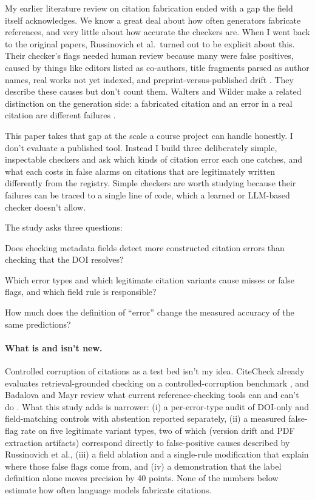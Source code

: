 \documentclass[acmsmall,screen,nonacm]{acmart}
\begin{document}
My earlier literature review on citation fabrication ended with a gap the field itself acknowledges. We know a great deal about how often generators fabricate references, and very little about how accurate the checkers are. When I went back to the original papers, Russinovich et al.\ turned out to be explicit about this. Their checker's flags needed human review because many were false positives, caused by things like editors listed as co-authors, title fragments parsed as author names, real works not yet indexed, and preprint-versus-published drift \citep{russinovich2026}. They describe these causes but don't count them. Walters and Wilder make a related distinction on the generation side: a fabricated citation and an error in a real citation are different failures \citep{walters2023}.

This paper takes that gap at the scale a course project can handle honestly. I don't evaluate a published tool. Instead I build three deliberately simple, inspectable checkers and ask which kinds of citation error each one catches, and what each costs in false alarms on citations that are legitimately written differently from the registry. Simple checkers are worth studying because their failures can be traced to a single line of code, which a learned or LLM-based checker doesn't allow.

The study asks three questions:
\begin{description}[leftmargin=1.2em,itemsep=1pt]
\item[RQ1] Does checking metadata fields detect more constructed citation errors than checking that the DOI resolves?
\item[RQ2] Which error types and which legitimate citation variants cause misses or false flags, and which field rule is responsible?
\item[RQ3] How much does the definition of ``error'' change the measured accuracy of the same predictions?
\end{description}

\paragraph{What is and isn't new.} Controlled corruption of citations as a test bed isn't my idea. CiteCheck already evaluates retrieval-grounded checking on a controlled-corruption benchmark \citep{khajavi2026citecheck}, and Badalova and Mayr review what current reference-checking tools can and can't do \citep{badalova2026}. What this study adds is narrower: (i) a per-error-type audit of DOI-only and field-matching controls with abstention reported separately, (ii) a measured false-flag rate on five legitimate variant types, two of which (version drift and PDF extraction artifacts) correspond directly to false-positive causes described by Russinovich et al., (iii) a field ablation and a single-rule modification that explain where those false flags come from, and (iv) a demonstration that the label definition alone moves precision by 40 points. None of the numbers below estimate how often language models fabricate citations.
\end{document}
